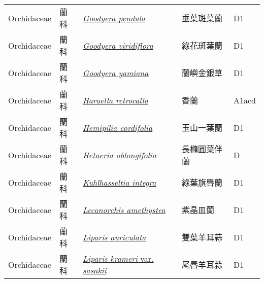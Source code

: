 {\begin{longtable}{p{2.5cm}p{2.5cm}p{4.5cm}p{2.5cm}p{3cm}}
    Orchidaceae & 蘭科 & \href{http://www.theplantlist.org/tpl1.1/search?q=Goodyera+pendula}{\textit{Goodyera pendula} } & 垂葉斑葉蘭 & D1 \index{Goodyera@\textit{Goodyera}!pendula@\textit{pendula}}  \index{垂葉斑葉蘭} \\
    Orchidaceae & 蘭科 & \href{http://www.theplantlist.org/tpl1.1/search?q=Goodyera+viridiflora}{\textit{Goodyera viridiflora} } & 綠花斑葉蘭 & D1 \index{Goodyera@\textit{Goodyera}!viridiflora@\textit{viridiflora}}  \index{綠花斑葉蘭} \\
    Orchidaceae & 蘭科 & \href{http://www.theplantlist.org/tpl1.1/search?q=Goodyera+yamiana}{\textit{Goodyera yamiana} } & 蘭嶼金銀草 & D1 \index{Goodyera@\textit{Goodyera}!yamiana@\textit{yamiana}}  \index{蘭嶼金銀草} \\
    Orchidaceae & 蘭科 & \href{http://www.theplantlist.org/tpl1.1/search?q=Haraella+retrocalla}{\textit{Haraella retrocalla} } & 香蘭 & A1acd \index{Haraella@\textit{Haraella}!retrocalla@\textit{retrocalla}}  \index{香蘭} \\
    Orchidaceae & 蘭科 & \href{http://www.theplantlist.org/tpl1.1/search?q=Hemipilia+cordifolia}{\textit{Hemipilia cordifolia} } & 玉山一葉蘭 & D1 \index{Hemipilia@\textit{Hemipilia}!cordifolia@\textit{cordifolia}}  \index{玉山一葉蘭} \\
    Orchidaceae & 蘭科 & \href{http://www.theplantlist.org/tpl1.1/search?q=Hetaeria+oblongifolia}{\textit{Hetaeria oblongifolia} } & 長橢圓葉伴蘭 & D \index{Hetaeria@\textit{Hetaeria}!oblongifolia@\textit{oblongifolia}}  \index{長橢圓葉伴蘭} \\
    Orchidaceae & 蘭科 & \href{http://www.theplantlist.org/tpl1.1/search?q=Kuhlhasseltia+integra}{\textit{Kuhlhasseltia integra} } & 綠葉旗唇蘭 & D1 \index{Kuhlhasseltia@\textit{Kuhlhasseltia}!integra@\textit{integra}}  \index{綠葉旗唇蘭} \\
    Orchidaceae & 蘭科 & \href{http://www.theplantlist.org/tpl1.1/search?q=Lecanorchis+amethystea}{\textit{Lecanorchis amethystea} } & 紫晶皿蘭 & D1 \index{Lecanorchis@\textit{Lecanorchis}!amethystea@\textit{amethystea}}  \index{紫晶皿蘭} \\
    Orchidaceae & 蘭科 & \href{http://www.theplantlist.org/tpl1.1/search?q=Liparis+auriculata}{\textit{Liparis auriculata} } & 雙葉羊耳蒜 & D1 \index{Liparis@\textit{Liparis}!auriculata@\textit{auriculata}}  \index{雙葉羊耳蒜} \\
    Orchidaceae & 蘭科 & \href{http://www.theplantlist.org/tpl1.1/search?q=Liparis+krameri+var.+sasakii}{\textit{Liparis krameri} var. \textit{sasakii} } & 尾唇羊耳蒜 & D1 \index{Liparis@\textit{Liparis}!krameri@\textit{krameri}!var. sasakii@var. \textit{sasakii}}  \index{尾唇羊耳蒜} \\

\end{longtable}}
